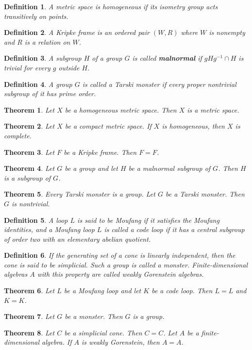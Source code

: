 \documentclass{article}
\newtheorem{theorem}{Theorem}
\newtheorem{definition}{Definition}
\begin{document}
\begin{definition}
A metric space is \emph{homogeneous} if its isometry group acts transitively on points.
\end{definition}
\begin{definition}
A \emph{Kripke frame} is an ordered pair $(W,R)$ where $W$ is nonempty and $R$ is a relation on $W$.
\end{definition}
\begin{definition}
A subgroup $H$ of a group $G$ is called \textbf{malnormal} if $gHg^{-1}\cap H$ is trivial for every $g$ outside $H$.
\end{definition}
\begin{definition}
A group $G$ is called a \emph{Tarski monster} if every proper nontrivial subgroup of it has prime order.
\end{definition}
\begin{theorem}
Let $X$ be a homogeneous metric space. Then $X$ is a metric space.
\end{theorem}
\begin{theorem}
Let $X$ be a compact metric space. If $X$ is homogeneous, then $X$ is complete.
\end{theorem}
\begin{theorem}
Let $F$ be a Kripke frame. Then $F=F$.
\end{theorem}
\begin{theorem}
Let $G$ be a group and let $H$ be a malnormal subgroup of $G$. Then $H$ is a subgroup of $G$.
\end{theorem}
\begin{theorem}
Every Tarski monster is a group. Let $G$ be a Tarski monster. Then $G$ is nontrivial.
\end{theorem}
\begin{definition}
A loop $L$ is said to be \emph{Moufang} if it satisfies the Moufang identities, and a Moufang loop $L$ is called a \emph{code loop} if it has a central subgroup of order two with an elementary abelian quotient.
\end{definition}
\begin{definition}
If the generating set of a cone is linearly independent, then the cone is said to be \emph{simplicial}. Such a group is called a \emph{monster}. Finite-dimensional algebras $A$ with this property are called \emph{weakly Gorenstein} algebras.
\end{definition}
\begin{theorem}
Let $L$ be a Moufang loop and let $K$ be a code loop. Then $L=L$ and $K=K$.
\end{theorem}
\begin{theorem}
Let $G$ be a monster. Then $G$ is a group.
\end{theorem}
\begin{theorem}
Let $C$ be a simplicial cone. Then $C=C$. Let $A$ be a finite-dimensional algebra. If $A$ is weakly Gorenstein, then $A=A$.
\end{theorem}
\end{document}
